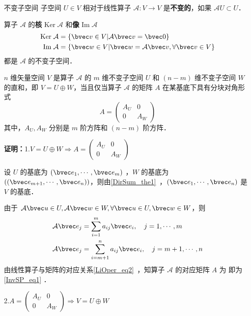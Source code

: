 
\begin{issues}
\issueTODO
\end{issues}

\begin{definition}{不变子空间}
子空间 $U\in V$ 相对于线性算子 $\mathcal{A}:V\rightarrow V$ 是\textbf{不变的}，如果 $\mathcal{A}U\subset U$．
\end{definition}
\begin{example}{}
算子 $\mathcal{A}$ 的\textbf{核} $\mathrm{Ker}\;\mathcal A$ 和\textbf{像} $\mathrm{Im}\;\mathcal{A}$
\begin{equation}
\begin{aligned}
\mathrm{Ker}\;\mathcal{A}&=\{\bvec v\in V|\mathcal{A}\bvec v=\bvec 0\}\\
\mathrm{Im}\;\mathcal{A}&=\{\bvec w\in V|\bvec w=\mathcal{A}\bvec v,\forall\bvec v\in V\}
\end{aligned}
\end{equation}
都是 $\mathcal A$ 的不变子空间．
\end{example}
\begin{theorem}{}
$n$ 维矢量空间 $V$ 是算子 $\mathcal{A}$ 的 $m$ 维不变子空间 $U$ 和 $(n-m)$ 维不变子空间 $W$ 的直和，即 $V=U\oplus W$，当且仅当算子 $\mathcal{A}$ 的矩阵 $A$ 在某基底下具有分块对角形式
\begin{equation}\label{InvSP_eq1}
A=\begin{pmatrix}
A_U&0\\
0&A_W
\end{pmatrix}
\end{equation}
其中，$A_U,A_W$ 分别是 $m$ 阶方阵和 $(n-m)$ 阶方阵．
\end{theorem}
\textbf{证明：}1.$
V=U\oplus W\Rightarrow A=\begin{pmatrix}
A_U&0\\
0&A_W
\end{pmatrix}
$

设 $U$ 的基底为 $(\bvec e_1,\cdots,\bvec e_m)$ ，$W$ 的基底为 $((\bvec e_{m+1},\cdots,\bvec e_n))$，则由\autoref{DirSum_the1}~，$(\bvec e_{1},\cdots,\bvec e_n)$ 是 $V$ 的基底．

由于 $\mathcal{A}\bvec u\in U, \mathcal{A}\bvec w\in W,\forall \bvec u\in U,\bvec w\in W$，则
\begin{equation}
\begin{aligned}
\mathcal{A}\bvec e_j&=\sum_{i=1}^m a_{ij}\bvec e_i,\quad j=1,\cdots ,m\\
\mathcal{A}\bvec e_j&=\sum_{i=m+1}^n a_{ij}\bvec e_i,\quad j=m+1,\cdots ,n
\end{aligned}
\end{equation}
由线性算子与矩阵的对应关系\autoref{LiOper_eq2}~，知算子 $\mathcal{A}$ 的对应矩阵 $A$ 为 即为\autoref{InvSP_eq1} ．

2.$
A=\begin{pmatrix}
A_U&0\\
0&A_W
\end{pmatrix}\Rightarrow V=U\oplus W
$